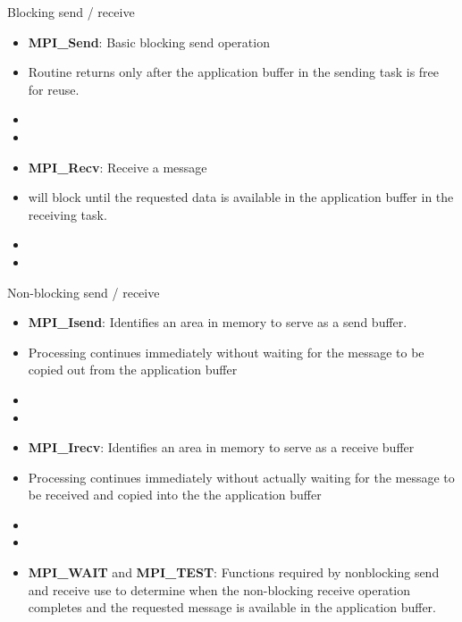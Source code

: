 \documentclass[10pt,t]{beamer}
\begin{document}
\begin{frame}
  \framebreak
  
  \begin{block}{Blocking send / receive}
    \begin{itemize}
    \item \textbf{MPI\_Send}: Basic blocking send operation
    \item Routine returns only after the application buffer in the sending task is free for reuse.
    \item[] 
    \item[] 
    \end{itemize}

    \begin{itemize}
    \item \textbf{MPI\_Recv}: Receive a message 
    \item will block until the requested data is available in the application buffer in the receiving task.
    \item[] 
    \item[] 
    \end{itemize}
  \end{block}
  
  \begin{block}{Non-blocking send / receive}
    \begin{itemize}
      \item \textbf{MPI\_Isend}: Identifies an area in memory to serve as a send buffer.
      \item Processing continues immediately without waiting for the message to be copied out from the application buffer
      \item[] 
      \item[] 
      \item \textbf{MPI\_Irecv}: Identifies an area in memory to serve as a receive buffer
      \item Processing continues immediately without actually waiting for the message to be received and copied into the the application buffer
      \item[] 
      \item[] 
      \item \textbf{MPI\_WAIT} and \textbf{MPI\_TEST}: Functions required by nonblocking send and receive use to determine when the non-blocking receive operation completes and the requested message is available in the application buffer.
    \end{itemize}
  \end{block}


\end{frame}
\end{document}
